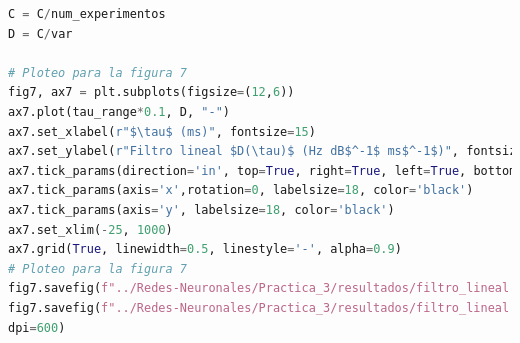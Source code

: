 \documentclass[11pt,twocolumn,twoside]{opticajnl}
\begin{document}
\begin{onecolumn}
\begin{lstlisting}[language=Python, caption={Implementación del método Runge-Kutta 4.}, label=python-code]
C = C/num_experimentos
D = C/var

# Ploteo para la figura 7
fig7, ax7 = plt.subplots(figsize=(12,6)) 
ax7.plot(tau_range*0.1, D, "-")
ax7.set_xlabel(r"$\tau$ (ms)", fontsize=15)
ax7.set_ylabel(r"Filtro lineal $D(\tau)$ (Hz dB$^-1$ ms$^-1$)", fontsize=15)
ax7.tick_params(direction='in', top=True, right=True, left=True, bottom=True)
ax7.tick_params(axis='x',rotation=0, labelsize=18, color='black')
ax7.tick_params(axis='y', labelsize=18, color='black')
ax7.set_xlim(-25, 1000)
ax7.grid(True, linewidth=0.5, linestyle='-', alpha=0.9)
# Ploteo para la figura 7
fig7.savefig(f"../Redes-Neuronales/Practica_3/resultados/filtro_lineal.pdf")
fig7.savefig(f"../Redes-Neuronales/Practica_3/resultados/filtro_lineal.png", 
dpi=600)

\end{lstlisting}
\end{onecolumn}
\end{document}
